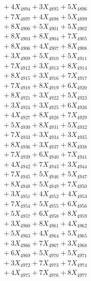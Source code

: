 \documentclass[a4paper,10pt]{article}
\begin{document}
{\begin{align}
&\;  + 4 X_{4894} + 3 X_{4895} + 5 X_{4896} \\[0.3ex]
&\;  + 7 X_{4897} + 4 X_{4898} + 5 X_{4899} \\[0.5ex]\allowbreak
&\;  + 8 X_{4900} + 5 X_{4901} + 5 X_{4902} \\[0.3ex]
&\;  + 8 X_{4903} + 8 X_{4904} + 7 X_{4905} \\[0.3ex]
&\;  + 8 X_{4906} + 4 X_{4907} + 8 X_{4908} \\[0.3ex]
&\;  + 3 X_{4909} + 5 X_{4910} + 5 X_{4911} \\[0.3ex]
&\;  + 7 X_{4912} + 3 X_{4913} + 8 X_{4914} \\[0.3ex]
&\;  + 8 X_{4915} + 3 X_{4916} + 7 X_{4917} \\[0.3ex]
&\;  + 7 X_{4918} + 8 X_{4919} + 6 X_{4920} \\[0.3ex]
&\;  + 8 X_{4921} + 3 X_{4922} + 5 X_{4923} \\[0.3ex]
&\;  + 3 X_{4924} + 3 X_{4925} + 6 X_{4926} \\[0.3ex]
&\;  + 4 X_{4927} + 8 X_{4928} + 7 X_{4929} \\[0.5ex]\allowbreak
&\;  + 5 X_{4930} + 8 X_{4931} + 5 X_{4932} \\[0.3ex]
&\;  + 7 X_{4933} + 3 X_{4934} + 3 X_{4935} \\[0.3ex]
&\;  + 8 X_{4936} + 3 X_{4937} + 8 X_{4938} \\[0.3ex]
&\;  + 7 X_{4939} + 6 X_{4940} + 7 X_{4941} \\[0.3ex]
&\;  + 4 X_{4942} + 7 X_{4943} + 3 X_{4944} \\[0.3ex]
&\;  + 7 X_{4945} + 5 X_{4946} + 5 X_{4947} \\[0.3ex]
&\;  + 8 X_{4948} + 5 X_{4949} + 7 X_{4950} \\[0.3ex]
&\;  + 3 X_{4951} + 4 X_{4952} + 4 X_{4953} \\[0.3ex]
&\;  + 7 X_{4954} + 5 X_{4955} + 6 X_{4956} \\[0.3ex]
&\;  + 5 X_{4957} + 6 X_{4958} + 8 X_{4959} \\[0.5ex]\allowbreak
&\;  + 3 X_{4960} + 8 X_{4961} + 4 X_{4962} \\[0.3ex]
&\;  + 5 X_{4963} + 4 X_{4964} + 5 X_{4965} \\[0.3ex]
&\;  + 3 X_{4966} + 7 X_{4967} + 3 X_{4968} \\[0.3ex]
&\;  + 6 X_{4969} + 5 X_{4970} + 5 X_{4971} \\[0.3ex]
&\;  + 3 X_{4972} + 7 X_{4973} + 7 X_{4974} \\[0.3ex]
&\;  + 4 X_{4975} + 7 X_{4976} + 8 X_{4977} \\[0.3ex]

\end{align}}
\end{document}
